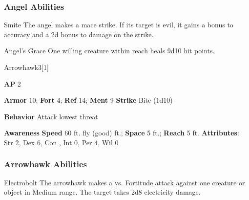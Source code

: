 \subsubsection{Angel Abilities}

\begin{freeability}{Smite}
The angel makes a mace strike.
If its target is evil, it gains a  bonus to accuracy and a \plus2d bonus to damage on the strike.
\end{freeability}

\vspace{0.5em}
\begin{freeability}{Angel's Grace}
One willing creature within reach heals 9d10 hit points.
\end{freeability}

\begin{monsection}{Arrowhawk}{3}[1]
\vspace{-1em}\vspace{-1em}
\begin{spellcontent}
\begin{spelltargetinginfo}
{\textbf{AP} 2}

\pari \textbf{Armor} 10;
\textbf{Fort} 4;
\textbf{Ref} 14;
\textbf{Ment} 9
\pari \textbf{Strike} Bite  (1d10)



\pari \textbf{Behavior} Attack lowest threat
\end{spelltargetinginfo}
\end{spellcontent}

\begin{monsterfooter}
\pari \textbf{Awareness} 
\pari \textbf{Speed} 60 ft. fly (good) ft.;
\textbf{Space} 5 ft.;
\textbf{Reach} 5 ft.
\pari \textbf{Attributes}:
Str 2,
Dex 6,
Con ,
Int 0,
Per 4,
Wil 0
\end{monsterfooter}
\end{monsection}


\subsubsection{Arrowhawk Abilities}

\begin{freeability}{Electrobolt}
The arrowhawk makes a  vs. Fortitude attack against one creature or object in Medium range.
\hit The target takes 2d8 electricity damage.
\end{freeability}


